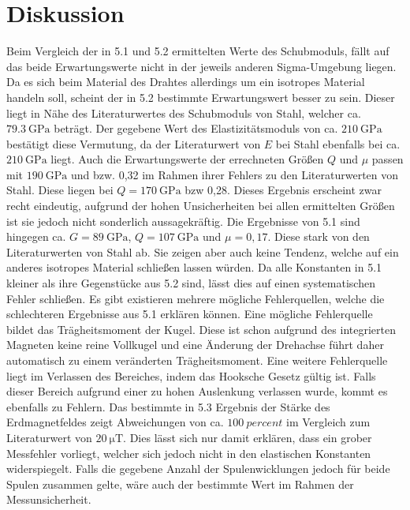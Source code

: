 
\section{Diskussion}
\label{sec:Diskussion}


Beim Vergleich der in 5.1 und 5.2 ermittelten Werte des Schubmoduls, fällt auf
 das beide Erwartungswerte nicht in der jeweils anderen Sigma-Umgebung liegen.
 Da es sich beim Material des Drahtes allerdings um ein isotropes Material handeln
  soll, scheint der in 5.2 bestimmte Erwartungswert besser zu sein. Dieser liegt in Nähe
  des Literaturwertes des Schubmoduls von Stahl, welcher ca. $\SI{79.3}{\giga\pascal}$\cite{EinführungMechanik} beträgt.
   Der gegebene Wert des Elastizitätsmoduls von ca. $\SI{210}{\giga\pascal}$
    bestätigt diese Vermutung, da der Literaturwert von $E$ bei Stahl ebenfalls
     bei ca. $\SI{210}{\giga\pascal}$\cite[624\psq]{TaschenbuchPhysik} liegt.
     Auch die Erwartungswerte der errechneten Größen $Q$ und $\mu$ passen mit
      $\SI{190}{\giga\pascal}$ und bzw. 0,32 im Rahmen ihrer Fehlers zu den Literaturwerten von Stahl.
      Diese liegen bei $Q = \SI{170}{\giga\pascal}$\cite{QundMu} bzw 0,28\cite{QundMu}.
      Dieses Ergebnis erscheint zwar recht eindeutig, aufgrund der hohen
      Unsicherheiten bei allen ermittelten Größen ist sie jedoch nicht sonderlich aussagekräftig.
      Die Ergebnisse von 5.1 sind hingegen ca. $G =\SI{89}{\giga\pascal}$, $Q = \SI{107}{\giga\pascal}$ und $\mu = 0,17$.
      Diese stark von den Literaturwerten von Stahl ab. Sie zeigen aber auch
      keine Tendenz, welche auf ein anderes isotropes Material schließen lassen würden.
      Da alle Konstanten in 5.1 kleiner als ihre Gegenstücke aus 5.2 sind, lässt dies auf einen systematischen Fehler schließen.
     Es gibt existieren mehrere mögliche Fehlerquellen, welche die schlechteren
      Ergebnisse aus 5.1 erklären können. Eine mögliche Fehlerquelle bildet das
       Trägheitsmoment der Kugel. Diese ist schon aufgrund des integrierten
        Magneten keine reine Vollkugel und eine Änderung der Drehachse führt daher
         automatisch zu einem veränderten Trägheitsmoment. Eine weitere
          Fehlerquelle liegt im Verlassen des Bereiches, indem das Hooksche
           Gesetz gültig ist. Falls dieser Bereich aufgrund einer zu hohen
            Auslenkung verlassen wurde, kommt es ebenfalls zu Fehlern.
            Das bestimmte in 5.3 Ergebnis der Stärke des Erdmagnetfeldes zeigt Abweichungen von ca. $\SI{100}{percent}$
            im Vergleich zum Literaturwert von $\SI{20}{\micro\tesla}$\cite{Erdmagnetfeld}. Dies lässt sich nur damit erklären, dass ein grober Messfehler vorliegt,
             welcher sich jedoch nicht in den elastischen Konstanten widerspiegelt.
              Falls die gegebene Anzahl der Spulenwicklungen jedoch für beide Spulen
               zusammen gelte, wäre auch der bestimmte Wert im Rahmen der Messunsicherheit.

